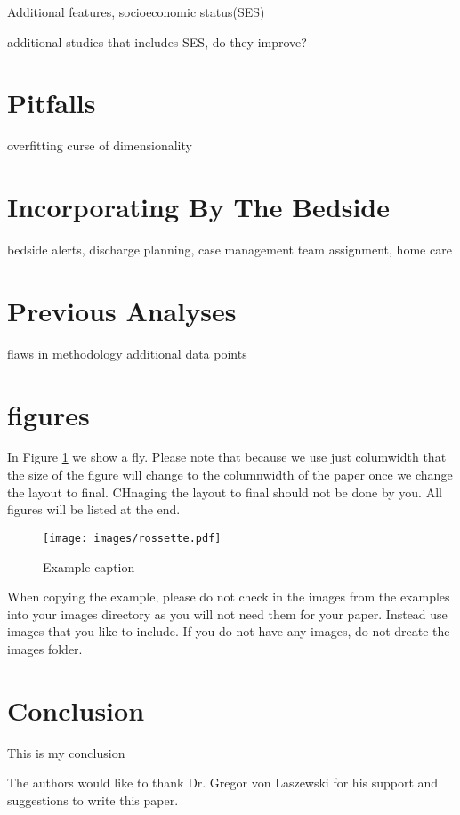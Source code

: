 \documentclass[sigconf]{acmart}
\begin{document}
Additional features, socioeconomic status(SES)

additional studies that includes SES, do they improve?

\section{Pitfalls}

overfitting
curse of dimensionality

\section{Incorporating By The Bedside}
bedside alerts, discharge planning, case management team assignment, home care

\section{Previous Analyses}

flaws in methodology
additional data points

\section{figures}

In Figure \ref{f:fly} we show a fly. Please note that because we use
just columwidth that the size of the figure will change to the
columnwidth of the paper once we change the layout to final. CHnaging
the layout to final should not be done by you. All figures will be
listed at the end.

\begin{figure}[!ht]
  \centering\texttt{[image: images/rossette.pdf]}
  \caption{Example caption}\label{f:fly}
\end{figure}

When copying the example, please do not check in the images from the
examples into your images directory as you will not need them for your
paper. Instead use images that you like to include. If you do not have
any images, do not dreate the images folder.

\section{Conclusion}

This is my conclusion

\begin{acks}

  The authors would like to thank Dr. Gregor von Laszewski for his
  support and suggestions to write this paper.

\end{acks}


 

\appendix


\end{document}

